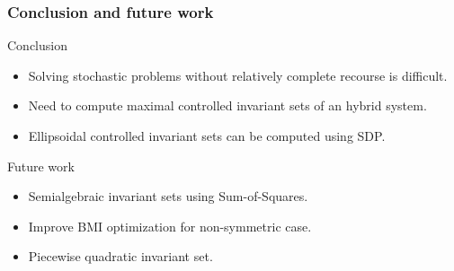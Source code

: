 \documentclass{beamer}
\begin{document}
\begin{frame}
  \frametitle{Conclusion and future work}
  \begin{block}{Conclusion}
    \begin{itemize}
      \item Solving stochastic problems without relatively complete recourse is \alert{difficult}.
      \item Need to compute maximal \alert{controlled invariant} sets of an \alert{hybrid} system.
      \item \alert{Ellipsoidal} controlled invariant sets can be computed using \alert{SDP}.
    \end{itemize}
  \end{block}
  \begin{block}{Future work}
    \begin{itemize}
      \item \alert{Semialgebraic} invariant sets using \alert{Sum-of-Squares}.
      \item Improve \alert{BMI} optimization for \alert{non-symmetric} case.
      \item \alert{Piecewise} quadratic invariant set.
    \end{itemize}
  \end{block}
\end{frame}
\end{document}
